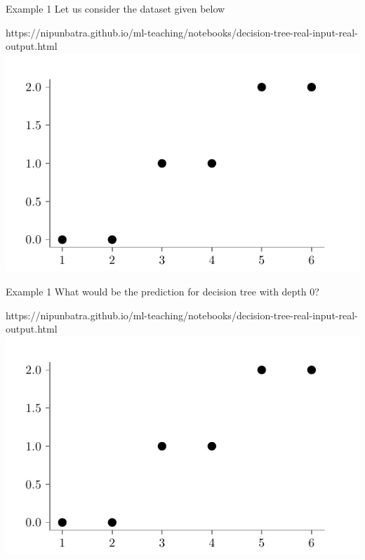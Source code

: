 \documentclass[usenames,dvipsnames]{beamer}
\begin{document}
\begin{frame}{Example 1}
Let us consider the dataset given below
\begin{center}
	\begin{notebookbox}{https://nipunbatra.github.io/ml-teaching/notebooks/decision-tree-real-input-real-output.html}
		\includegraphics{../assets/decision-trees/figures/ri-ro-dataset.pdf}
	  \end{notebookbox}
\end{center}
\end{frame}

\begin{frame}{Example 1}
What would be the prediction for decision tree with depth 0?
\begin{center}
	\begin{notebookbox}{https://nipunbatra.github.io/ml-teaching/notebooks/decision-tree-real-input-real-output.html}
		\includegraphics{../assets/decision-trees/figures/ri-ro-dataset.pdf}
	  \end{notebookbox}
\end{center}
\end{frame}
\end{document}

